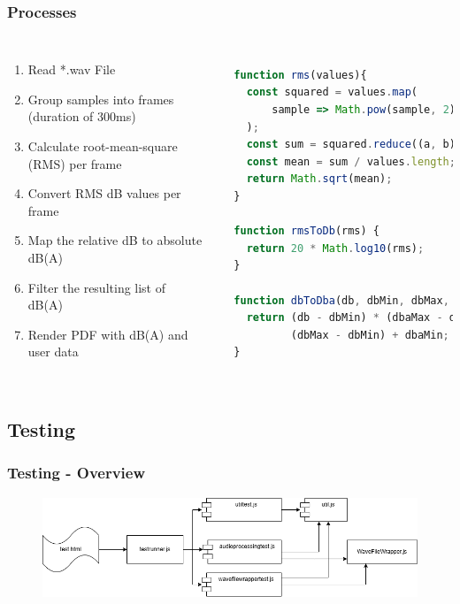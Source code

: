 \begin{frame}[fragile]
    \frametitle{Processes}
    \begin{columns}
            \begin{enumerate}
                \item Read *.wav File
                \item Group samples into frames (duration of 300ms)
                \item Calculate root-mean-square (RMS) per frame
                \item Convert RMS dB values per frame
                \item Map the relative dB to absolute dB(A)
                \item Filter the resulting list of dB(A)
                \item Render PDF with dB(A) and user data
            \end{enumerate}
        \small
        \begin{lstlisting}[basicstyle=\tiny,language=JavaScript]

  function rms(values){
    const squared = values.map(
        sample => Math.pow(sample, 2)
    );
    const sum = squared.reduce((a, b) => a + b);
    const mean = sum / values.length;
    return Math.sqrt(mean);
  }

  function rmsToDb(rms) {
    return 20 * Math.log10(rms);
  }

  function dbToDba(db, dbMin, dbMax, dbaMin, dbaMax) {
    return (db - dbMin) * (dbaMax - dbaMin) /
           (dbMax - dbMin) + dbaMin;
  }
 
        \end{lstlisting}
    \end{columns}
\end{frame}

\subsection{Testing}\label{subsec:testing}

\begin{frame}
    \frametitle{Testing - Overview}
    \begin{figure}[H]
        \centering
        \includegraphics[width=1\textwidth]{../assets/overview_test_framework.png}
    \end{figure}
\end{frame}

